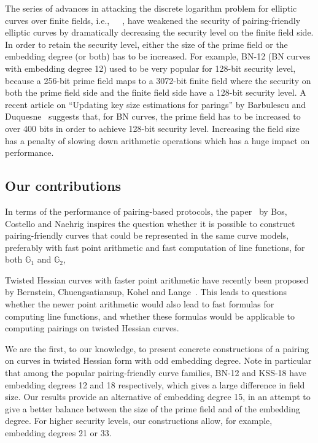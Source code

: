 The series of advances in attacking the discrete logarithm problem for elliptic curves over finite fields,
i.e.,~\cite{2016/KB}~\cite{2015/BGGM}~\cite{2015/BGK},
have weakened the security of pairing-friendly elliptic curves by dramatically decreasing the security level on the finite field side.
In order to retain the security level, either the size of the prime field or the embedding degree (or both) has to be increased.
For example, BN-12 (BN curves with embedding degree 12) used to be very popular for 128-bit security level,
because a 256-bit prime field maps to a 3072-bit finite field
where the security on both the prime field side and the finite field side have a 128-bit security level.
A recent article on ``Updating key size estimations for parings'' by Barbulescu and Duquesne~\cite{2017/keysize}
suggests that, for BN curves, the prime field has to be increased to over 400 bits in order to achieve 128-bit security level.
Increasing the field size has a penalty of slowing down arithmetic operations which has a huge impact on performance.


\subsection{Our contributions}

In terms of the performance of pairing-based protocols,
the paper~\cite{2013/bos-pairing} by Bos, Costello and Naehrig
inspires the question whether it is possible to
construct pairing-friendly curves that could be represented in the same curve models,
preferably with fast point arithmetic and fast computation of line functions,
for both $\mathbb{G}_1$ and $\mathbb{G}_2$,

Twisted Hessian curves with faster point arithmetic have recently been proposed by
Bernstein, Chuengsatiansup, Kohel and Lange~\cite{2015/hessian}.
This leads to questions whether the newer point arithmetic would also lead to fast formulas for computing line functions,
and whether these formulas would be applicable to computing pairings on twisted Hessian curves.

We are the first, to our knowledge, to present concrete constructions of a pairing on curves in twisted Hessian form with odd embedding degree.
Note in particular that among the popular pairing-friendly curve families,
BN-12 and KSS-18 have embedding degrees 12 and 18 respectively, which gives a large difference in field size.
Our results provide an alternative of embedding degree 15,
in an attempt to give a better balance between the size of the prime field and of the embedding degree.
For higher security levels, our constructions allow, for example, embedding degrees 21 or 33.

